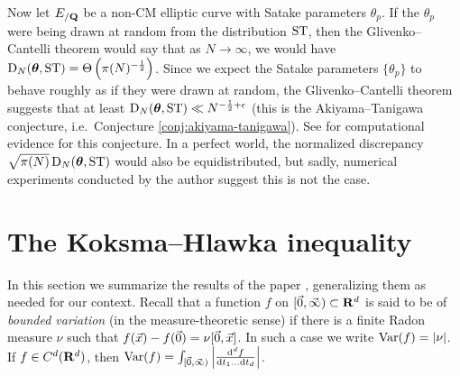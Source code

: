 Now let $E_{/\mathbf{Q}}$ be a non-CM elliptic curve with Satake parameters 
$\theta_p$. If the $\theta_p$ were being drawn at random from the distribution 
$\mathrm{ST}$, then the Glivenko--Cantelli theorem would say that as $N\to \infty$, 
we would have $\operatorname{D}_N({\boldsymbol\theta},\mathrm{ST}) = \Theta\left(\pi(N)^{-\frac 1 2}\right)$. Since 
we expect the Satake parameters $\{\theta_p\}$ to behave roughly as if they were 
drawn at random, the Glivenko--Cantelli theorem suggests that at least 
$\operatorname{D}_N({\boldsymbol\theta},\mathrm{ST}) \ll N^{-\frac 1 2+\epsilon}$ (this is the 
Akiyama--Tanigawa conjecture, i.e.~Conjecture \ref{conj:akiyama-tanigawa}). 
See \cite{akiyama-tanigawa-1999} for computational evidence for this 
conjecture. In a perfect world, the normalized discrepancy 
$\sqrt{\pi(N)}\operatorname{D}_N({\boldsymbol\theta},\mathrm{ST})$ would also be equidistributed, but sadly, 
numerical experiments conducted by the author suggest this is not the case. 





\section{The Koksma--Hlawka inequality}

In this section we summarize the results of the paper \cite{okten-1999}, 
generalizing them as needed for our context. Recall that a function $f$ on 
$[\vec{0},\vec{\infty})\subset \mathbf{R}^d$ is said to be of \emph{bounded variation} (in 
the measure-theoretic sense) if there is a finite Radon measure $\nu$ such that 
$f(\vec{x}) - f(\vec{0}) = \nu[\vec{0},\vec{x}]$. In such a case we write 
$\operatorname{Var}(f) = |\nu|$. If $f\in C^d(\mathbf{R}^d)$, then 
$\operatorname{Var}(f) = \int_{[\vec{0},\vec{\infty})} \left|\frac{\mathrm{d}^d f}{\mathrm{d} t_1 \dots \mathrm{d} t_d} \right|$. 

